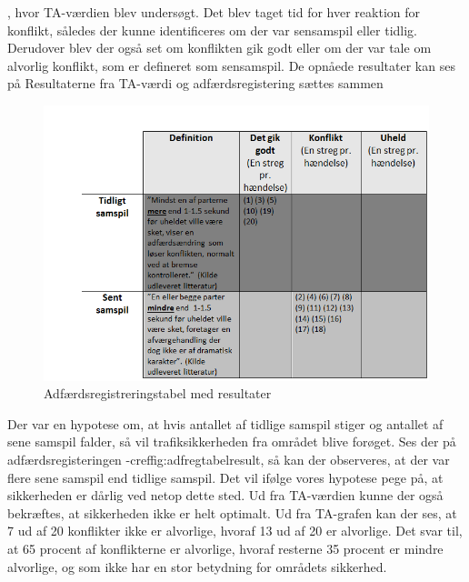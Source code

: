 , hvor TA-værdien blev undersøgt.
Det blev taget tid for hver reaktion for konflikt, således der kunne identificeres om der var sensamspil eller tidlig. Derudover blev der også set om konflikten gik godt eller om der var tale om alvorlig konflikt, som er defineret som sensamspil. De opnåede resultater kan ses på %
Resultaterne fra TA-værdi og adfærdsregistering sættes sammen
\begin{figure}[htbp]
  \centering
  \begin{adjustbox}{max width=\textwidth}
    \includegraphics{figures/Billederogfigur/obstabelresult.png} %
 \end{adjustbox}
  \caption{Adfærdsregistreringstabel med resultater}
  \label{fig:adfregtabelresult}
\end{figure}
Der var en hypotese om, at hvis antallet af tidlige samspil stiger og antallet af sene samspil falder, så vil trafiksikkerheden fra området blive forøget. Ses der på adfærdsregisteringen -cref{fig:adfregtabelresult}, så kan der observeres, at der var flere sene samspil end tidlige samspil. Det vil ifølge vores hypotese pege på, at sikkerheden er dårlig ved netop dette sted. Ud fra TA-værdien kunne der også bekræftes, at sikkerheden ikke er helt optimalt.
Ud fra TA-grafen kan der ses, at 7 ud af 20 konflikter ikke er alvorlige, hvoraf 13 ud af 20 er alvorlige. Det svar til, at 65 procent af konflikterne er alvorlige, hvoraf resterne 35 procent er mindre alvorlige, og som ikke har en stor betydning for områdets sikkerhed.

